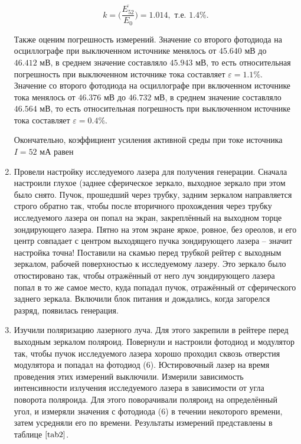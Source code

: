 \documentclass[a4paper,12pt]{article} %
\begin{document}
\begin{enumerate}
    \[ k = \overline{\Big(\frac{E_{52}}{E_0}\Big)} = 1.014, \text{ т.е. } 1.4\%. \]

    Также оценим погрешность измерений. Значение со второго фотодиода на осциллографе при выключенном источнике менялось от $45.640\text{ мВ}$ до $46.412\text{ мВ}$, в среднем значение составляло $45.943\text{ мВ}$, то есть относительная погрешность при выключенном источнике тока составляет $\varepsilon=1.1\%$. Значение со второго фотодиода на осциллографе при включенном источнике тока менялось от $46.376\text{ мВ}$ до $46.732\text{ мВ}$, в среднем значение составляло $46.564\text{ мВ}$, то есть относительная погрешность при выключенном источнике тока составляет $\varepsilon=0.4\%$. 
    
    Окончательно, коэффициент усиления активной среды при токе источника $I=52\text{ мА}$ равен

    \begin{center}
    \end{center}
    
    \item Провели настройку исследуемого лазера для получения генерации. Сначала настроили глухое (заднее сферическое зеркало, выходное зеркало при этом было снято. Пучок, прошедший через трубку, задним зеркалом направляется строго обратно так, чтобы после вторичного прохождения через трубку исследуемого лазера он попал на экран, закреплённый на выходном торце зондирующего лазера. Пятно на этом экране яркое, ровное, без ореолов, и его центр совпадает с центром выходящего пучка зондирующего лазера -- значит настройка точна! Поставили на скамью перед трубкой рейтер с выходным зеркалом, рабочей поверхностью к исследуемому лазеру. Это зеркало было отюстировано так, чтобы отражённый от него луч зондирующего лазера попал в то же самое место, куда попадал пучок, отражённый от сферического заднего зеркала. Включили блок питания и дождались, когда загорелся разряд, появилась генерация.
    \item Изучили поляризацию лазерного луча. Для этого закрепили в рейтере перед выходным зеркалом поляроид. Повернули и настроили фотодиод и модулятор так, чтобы пучок исследуемого лазера хорошо проходил сквозь отверстия модулятора и попадал на фотодиод (6). Юстировочный лазер на время проведения этих измерений выключили. Измерили зависимость интенсивности излучения исследуемого лазера в зависимости от угла поворота поляроида. Для этого поворачивали поляроид на определённый угол, и измеряли значения с фотодиода (6) в течении некоторого времени, затем усредняли его по времени. Результаты измерений представлены в таблице $\ref{tab2}$.


\end{enumerate}
\end{document}
